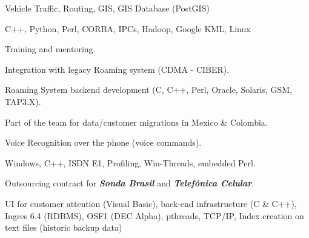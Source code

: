 \documentclass[letterpaper]{cvitae}
\begin{document}
\begin{minipage}[t]{0.66\textwidth}
\begin{tightitemize}
\item Vehicle Traffic, Routing, GIS, GIS Database (PostGIS)
\item C++, Python, Perl, CORBA, IPCs, Hadoop, Google KML, Linux
\item Training and mentoring.
\end{tightitemize}

\sectionspace


\begin{tightitemize}
\item Integration with legacy Roaming system (CDMA - CIBER).
\item Roaming System backend development (C, C++, Perl, Oracle, Solaris, GSM, TAP3.X).
\item Part of the team for data/customer migrations in Mexico \& Colombia.
\end{tightitemize}

\sectionspace


\begin{tightitemize}
\item Voice Recognition over the phone (voice commands).
\item Windows, C++, ISDN E1, Profiling, Win-Threads, embedded Perl.
\end{tightitemize}

\sectionspace


\begin{tightitemize}
\item Outsourcing contract for \textbf{\textit{Sonda Brasil}} and \textbf{\textit{Telefônica Celular}}.
\item UI for customer attention (Visual Basic), back-end infrastructure (C \& C++), Ingres 6.4 (RDBMS), OSF1 (DEC Alpha), pthreads, TCP/IP, Index creation on text files (historic backup data)
\end{tightitemize}


\end{minipage}
\end{document}
